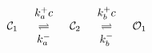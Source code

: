 \documentclass{article}
\def\C{\mathcal{C}}
\def\O{\mathcal{O}}
\begin{document}
\[
\begin{array}{ccccc} 
\C_{1} & \revrxn{k_a^+ c}{k_a^-} & \C_{2} & \revrxn{k_b^+ c}{k_b^-} & \O_{1} \\ 
\end{array}
\]
\end{document}

